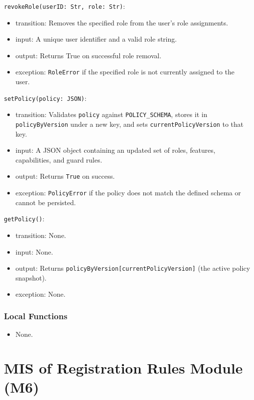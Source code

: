 \documentclass[12pt, titlepage]{article}
\begin{document}
\noindent \texttt{revokeRole(userID: Str, role: Str)}:
\begin{itemize}
\item transition: Removes the specified role from the user's role assignments.
\item input: A unique user identifier and a valid role string.
\item output: Returns True on successful role removal.
\item exception: \texttt{RoleError} if the specified role is not currently assigned to the user.
\end{itemize}

\noindent \texttt{setPolicy(policy: JSON)}:
\begin{itemize}
\item transition: Validates \texttt{policy} against \texttt{POLICY\_SCHEMA}, stores it in \texttt{policyByVersion} under a new key, and sets \texttt{currentPolicyVersion} to that key.
\item input: A JSON object containing an updated set of roles, features, capabilities, and guard rules.
\item output: Returns \texttt{True} on success.
\item exception: \texttt{PolicyError} if the policy does not match the defined schema or cannot be persisted.
\end{itemize}

\noindent \texttt{getPolicy()}:
\begin{itemize}
\item transition: None.
\item input: None.
\item output: Returns \texttt{policyByVersion[currentPolicyVersion]} (the active policy snapshot).
\item exception: None.
\end{itemize}

\subsubsection{Local Functions}

\begin{itemize}
    \item None.
\end{itemize}

\section{MIS of Registration Rules Module (M6)} \label{MIS_M6}
\end{document}
